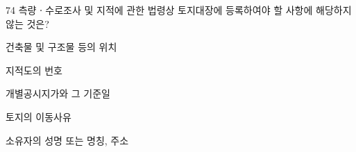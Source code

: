 \begin{question}{74}
측량ㆍ수로조사 및 지적에 관한 법령상 토지대장에 등록하여야 할 사항에 해당하지 않는 것은?
\begin{choices}
  \item 건축물 및 구조물 등의 위치
  \item 지적도의 번호
  \item 개별공시지가와 그 기준일
  \item 토지의 이동사유
  \item 소유자의 성명 또는 명칭, 주소
\end{choices}
\end{question}
